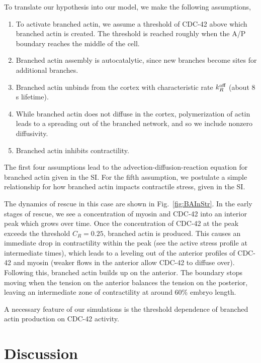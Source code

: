 \documentclass[11pt]{article}
\newcommand{\6}[1]{#1_{\text{6}}}
\newcommand{\3}[1]{#1_{\text{3}}}
\begin{document}
To translate our hypothesis into our model, we make the following assumptions, 
\begin{enumerate}
\item To activate branched actin, we assume a threshold of CDC-42 above which branched actin is created. The threshold is reached roughly when the A/P boundary reaches the middle of the cell.
\item Branched actin assembly is autocatalytic, since new branches become sites for additional branches.
\item Branched actin unbinds from the cortex with characteristic rate $k^\text{off}_R$ (about 8 s lifetime).
\item While branched actin does not diffuse in the cortex, polymerization of actin leads to a spreading out of the branched network, and so we include nonzero diffusivity. 
\item Branched actin inhibits contractility. 
\end{enumerate}
The first four assumptions lead to the advection-diffusion-reaction equation for branched actin given in the SI. For the fifth assumption, we postulate a simple relationship for how branched actin impacts contractile stress, given in the SI. 

The dynamics of rescue in this case are shown in Fig.\ \ref{fig:BAInStr}. In the early stages of rescue, we see a concentration of myosin and CDC-42 into an interior peak which grows over time. Once the concentration of CDC-42 at the peak exceeds the threshold $C_R=0.25$, branched actin is produced. This causes an immediate drop in contractility within the peak (see the active stress profile at intermediate times), which leads to a leveling out of the anterior profiles of CDC-42 and myosin (weaker flows in the anterior allow CDC-42 to diffuse over). Following this, branched actin builds up on the anterior. The boundary stops moving when the tension on the anterior balances the tension on the posterior, leaving an intermediate zone of contractility at around 60\% embryo length. 

A necessary feature of our simulations is the threshold dependence of branched actin production on CDC-42 activity.


\section*{Discussion}
\end{document}
